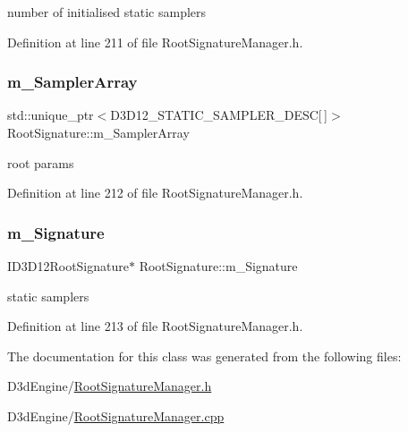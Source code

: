 number of initialised static samplers 



Definition at line 211 of file Root\+Signature\+Manager.\+h.

\mbox{\label{class_root_signature_a7fea24906a1437ca55aaac9a8f6cc2f4}} 
\subsubsection{\texorpdfstring{m\+\_\+\+Sampler\+Array}{m\_SamplerArray}}
{\footnotesize\ttfamily std\+::unique\+\_\+ptr$<$D3\+D12\+\_\+\+S\+T\+A\+T\+I\+C\+\_\+\+S\+A\+M\+P\+L\+E\+R\+\_\+\+D\+E\+SC\mbox{[}$\,$\mbox{]}$>$ Root\+Signature\+::m\+\_\+\+Sampler\+Array\hspace{0.3cm}{\ttfamily [protected]}}



root params 



Definition at line 212 of file Root\+Signature\+Manager.\+h.

\mbox{\label{class_root_signature_a9c2454e65f7e2512952ab74c967572d3}} 
\subsubsection{\texorpdfstring{m\+\_\+\+Signature}{m\_Signature}}
{\footnotesize\ttfamily I\+D3\+D12\+Root\+Signature$\ast$ Root\+Signature\+::m\+\_\+\+Signature\hspace{0.3cm}{\ttfamily [protected]}}



static samplers 



Definition at line 213 of file Root\+Signature\+Manager.\+h.



The documentation for this class was generated from the following files\+:\begin{DoxyCompactItemize}
\item 
D3d\+Engine/\mbox{\hyperlink{_root_signature_manager_8h}{Root\+Signature\+Manager.\+h}}\item 
D3d\+Engine/\mbox{\hyperlink{_root_signature_manager_8cpp}{Root\+Signature\+Manager.\+cpp}}\end{DoxyCompactItemize}
